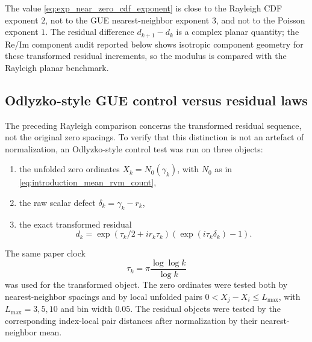 \documentclass[12pt]{article}
\numberwithin{equation}{section}
\begin{document}
\noindent The value \eqref{eq:exp_near_zero_cdf_exponent} is close to the Rayleigh CDF exponent \(2\), not to the GUE nearest-neighbor exponent \(3\), and not to the Poisson exponent \(1\).  The residual difference \(d_{k+1}-d_k\) is a complex planar quantity; the Re/Im component audit reported below shows isotropic component geometry for these transformed residual increments, so the modulus is compared with the Rayleigh planar benchmark.

\subsection{Odlyzko-style GUE control versus residual laws}
\label{sec:odlyzko_style_gue_control}

The preceding Rayleigh comparison concerns the transformed residual sequence, not the original zero spacings.  To verify that this distinction is not an artefact of normalization, an Odlyzko-style control test was run on three objects:
\begin{enumerate}[label=(\roman*)]
\item the unfolded zero ordinates \(X_k=N_0(\gamma_k)\), with \(N_0\) as in \eqref{eq:introduction_mean_rvm_count},
\item the raw scalar defect \(\delta_k=\gamma_k-r_k\),
\item the exact transformed residual
\[
d_k=
\exp(\tau_k/2+i r_k\tau_k)
\left(\exp(i\tau_k\delta_k)-1\right).
\]
\end{enumerate}
The same paper clock
\[
\tau_k=\pi\frac{\log\log k}{\log k}
\]
was used for the transformed object.  The zero ordinates were tested both by nearest-neighbor spacings and by local unfolded pairs \(0<X_j-X_i\leq L_{\max}\), with \(L_{\max}=3,5,10\) and bin width \(0.05\).  The residual objects were tested by the corresponding index-local pair distances after normalization by their nearest-neighbor mean.
\end{document}
